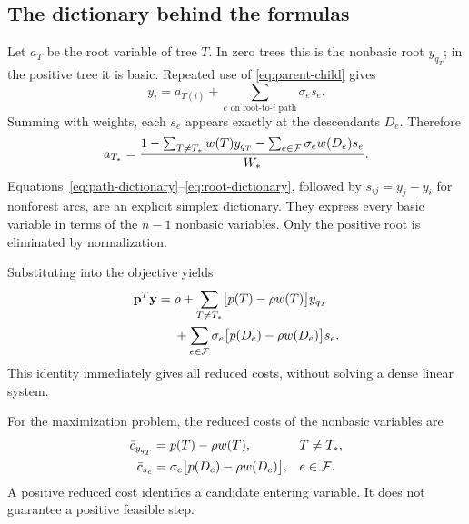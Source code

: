 \subsection{The dictionary behind the formulas}
Let $a_T$ be the root variable of tree $T$. In zero trees this is the
nonbasic root $y_{q_T}$; in the positive tree it is basic. Repeated use of
\eqref{eq:parent-child} gives
\begin{equation}\label{eq:path-dictionary}
 y_i=a_{T(i)}+\sum_{e\text{ on root-to-}i\text{ path}}\sigma_e s_e.
\end{equation}
Summing with weights, each $s_e$ appears exactly at the descendants $D_e$.
Therefore
\begin{equation}\label{eq:root-dictionary}
 a_{T_*}=\frac{1-\sum_{T\ne T_*}w(T)y_{q_T}
                    -\sum_{e\in\mathcal F}\sigma_e w(D_e)s_e}{W_*}.
\end{equation}
Equations~\eqref{eq:path-dictionary}--\eqref{eq:root-dictionary}, followed
by $s_{ij}=y_j-y_i$ for nonforest arcs, are an explicit simplex dictionary.
They express every basic variable in terms of the $n-1$ nonbasic variables.
Only the positive root is eliminated by normalization.

Substituting into the objective yields
\begin{equation}\label{eq:objective-dictionary}
\begin{split}
 \mathbf{p}^T\mathbf{y}={}&\rho+
 \sum_{T\ne T_*}\bigl[p(T)-\rho w(T)\bigr]y_{q_T}\\
 &+\sum_{e\in\mathcal F}\sigma_e\bigl[p(D_e)-\rho w(D_e)\bigr]s_e.
\end{split}
\end{equation}
This identity immediately gives all reduced costs, without solving a dense
linear system.

\begin{proposition}\label{prop:pricing}
For the maximization problem, the reduced costs of the nonbasic variables are
\begin{align}
 \bar c_{y_{q_T}}&=p(T)-\rho w(T),&&T\ne T_*,\label{eq:rc-node}\\
 \bar c_{s_e}&=\sigma_e\bigl[p(D_e)-\rho w(D_e)\bigr],&&e\in\mathcal F.
 \label{eq:rc-edge}
\end{align}
A positive reduced cost identifies a candidate entering variable. It does
not guarantee a positive feasible step.
\end{proposition}

